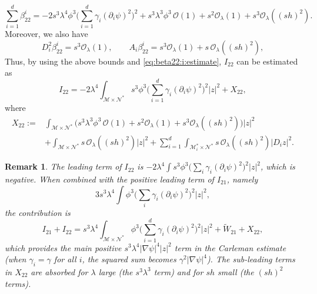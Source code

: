 \documentclass[11pt,oneside,leqno]{amsart}
\numberwithin{equation}{section}
\numberwithin{equation}{section}
\newtheorem{remark}[theorem]{Remark}
\begin{document}
\begin{equation*}
\sum_{i=1}^{d}\beta_{22}^{i}=-2s^{3}\lambda^{4}\phi^{3}\bigg(\sum_{i=1}^{d}\gamma_{i}(\partial_{i}\psi)^{2}\bigg)^{2}+s^{3}\lambda^{3}\phi^{3}\,\mathcal{O}(1)+s^{2}\mathcal{O}_{\lambda}(1)+s^{3}\mathcal{O}_{\lambda}((sh)^{2}).
\end{equation*}
Moreover, we also have
\begin{equation*}
D_{i}^{2}\beta_{22}^{i}=s^{3}\mathcal{O}_{\lambda}(1),\qquad A_{i}\beta_{22}^{i}=s^{3}\mathcal{O}_{\lambda}(1)+s\,\mathcal{O}_{\lambda}((sh)^{2}),
\end{equation*}
Thus, by using the above bounds and \eqref{eq:beta22:i:estimate}, $I_{22}$ can be estimated as 
\begin{equation}\label{eq:I22:final}
I_{22}=-2\lambda^{4}\int_{\mathcal{M}\times\mathcal{N}^{\ast}}s^{3}\phi^{3}\bigg(\sum_{i=1}^{d}\gamma_{i}(\partial_{i}\psi)^{2}\bigg)^{2}|z|^{2}+X_{22},
\end{equation}
where 
\begin{equation}\label{eq:X22}
\begin{aligned}
X_{22}:=&\int_{\mathcal{M}\times\mathcal{N}^{\ast}}\Big(s^{3}\lambda^{3}\phi^{3}\,\mathcal{O}(1)+s^{2}\mathcal{O}_{\lambda}(1)+s^{3}\mathcal{O}_{\lambda}((sh)^{2})\Big)|z|^{2}\\
&+\int_{\mathcal{M}\times\mathcal{N}^{\ast}}s\,\mathcal{O}_{\lambda}((sh)^{2})|z|^{2}+\sum_{i=1}^{d}\int_{\mathcal{M}_{i}^{\ast}\times\mathcal{N}^{\ast}}s\,\mathcal{O}_{\lambda}((sh)^{2})|D_{i}z|^{2}.
\end{aligned}
\end{equation}
\begin{remark}
The leading term of $I_{22}$ is $\displaystyle -2\lambda^{4}\int s^{3}\phi^{3}\bigg(\sum_{i}\gamma_{i}(\partial_{i}\psi)^{2}\bigg)^{2}|z|^{2}$, which is negative. When combined with the positive leading term of $I_{21}$, namely 
$$3s^{3}\lambda^{4}\int\phi^{3}\bigg(\sum_{i}\gamma_{i}(\partial_{i}\psi)^{2}\bigg)^{2}|z|^{2},$$ the contribution is
\begin{equation*}
I_{21}+I_{22}=s^{3}\lambda^{4}\int_{\mathcal{M}\times\mathcal{N}^{\ast}}\phi^{3}\bigg(\sum_{i=1}^{d}\gamma_{i}(\partial_{i}\psi)^{2}\bigg)^{2}|z|^{2}+\widetilde{W}_{21}+X_{22},
\end{equation*}
which provides the main positive $s^{3}\lambda^{4}|\nabla\psi|^{4}|z|^{2}$ term in the Carleman estimate (when $\gamma_{i}=\gamma$ for all $i$, the squared sum becomes $\gamma^{2}|\nabla\psi|^{4}$). The sub-leading terms in $X_{22}$ are absorbed for $\lambda$ large (the $s^{3}\lambda^{3}$ term) and for $sh$ small (the $(sh)^{2}$ terms).
\end{remark}
\end{document}

